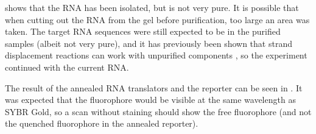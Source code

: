  shows that the RNA has been isolated, but is not very pure. It is possible that when cutting out the RNA from the gel before purification, too large an area was taken. The target RNA sequences were still expected to be in the purified samples (albeit not very pure), and it has previously been shown that strand displacement reactions can work with unpurified components \cite{Thubagere2017}, so the experiment continued with the current RNA.

The result of the annealed RNA translators and the reporter can be seen in . It was expected that the fluorophore would be visible at the same wavelength as SYBR Gold, so a scan without staining should show the free fluorophore (and not the quenched fluorophore in the annealed reporter).

